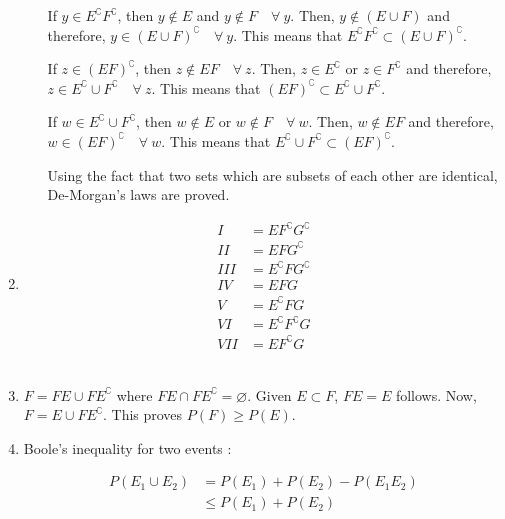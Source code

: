 \begin{enumerate}
\begin{enumerate}
		If $ y \in E^\complement F^\complement $, then $ y \notin E $ and $ y \notin F \quad \forall \ y$.
		Then, $ y \notin (E \cup F) $ and therefore, $ y \in (E \cup F)^\complement \quad \forall \ y$.
		This means that $  E^\complement F^\complement \subset (E \cup F)^\complement $.
		
		If $ z \in (EF)^\complement $, then $ z \notin EF \quad \forall \ z$.
		Then, $ z \in E^\complement$ or $ z \in F^\complement $ and therefore, $ z \in E^\complement \cup F^\complement \quad \forall \ z$.
		This means that $  (EF)^\complement \subset E^\complement \cup F^\complement $.
		
		If $ w \in E^\complement \cup F^\complement $, then $ w \notin E $ or $ w \notin F \quad \forall \ w$.
		Then, $ w \notin EF $ and therefore, $ w \in (EF)^\complement  \quad \forall \ w$.
		This means that $ E^\complement \cup F^\complement \subset (EF)^\complement$.
		
		Using the fact that two sets which are subsets of each other are identical, De-Morgan's laws are proved.
		
	\end{enumerate}
	
	\item 
		\begin{align}
			I &= E F^\complement G^\complement \\
			II &= E F G^\complement \\
			III &= E^\complement F G^\complement \\
			IV &= EFG \\
			V &= E^\complement F G \\
			VI &= E^\complement F^\complement G \\
			VII &= E F^\complement G
		\end{align}
	\\
	
	\item $ F = FE \cup F E^\complement $ where $ FE \cap F E^\complement = \varnothing $.
	Given $ E \subset F $, $ FE = E $ follows. Now, $ F = E \cup F E^\complement $.
	This proves $ P(F) \geq P(E) $.
	
	\item Boole's inequality for two events : 
	
		\begin{align}
			P(E_1 \cup E_2) &= P(E_1) + P(E_2) - P(E_1 E_2)\\
			& \leq P(E_1) + P(E_2)
		\end{align}
		

\end{enumerate}
